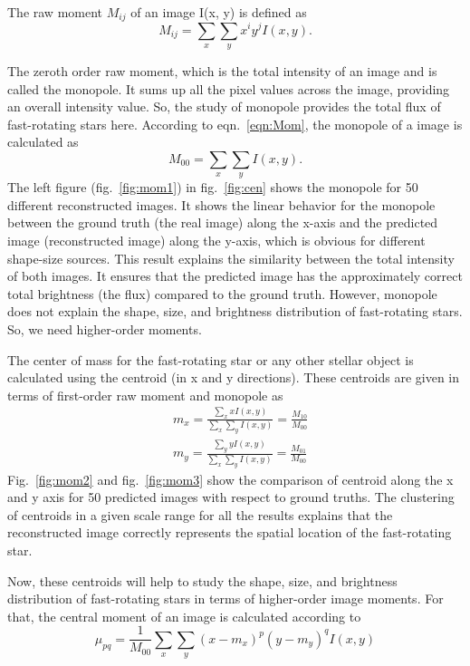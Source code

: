 The raw moment $M_{ij}$ of an image I(x, y) is defined as \citep{hu1962visual}
\begin{equation}
	M_{ij} = \sum_{x} \sum_{y} x^i y^j I(x, y).
	\label{eqn:Mom}
\end{equation}

The zeroth order raw moment, which is the total intensity of an image and is called the monopole. It sums up all the pixel values across the image, providing an overall intensity value. So, the study of monopole provides the total flux of fast-rotating stars here. According to eqn.~\ref{eqn:Mom}, the monopole of a image is calculated as 
\begin{equation}
	M_{00} = \sum_{x} \sum_{y} I(x, y).
\end{equation}
The left figure (fig.~\ref{fig:mom1}) in fig.~\ref{fig:cen} shows the monopole for 50 different reconstructed images. It shows the linear behavior for the monopole between the ground truth (the real image) along the x-axis and the predicted image (reconstructed image) along the y-axis, which is obvious for different shape-size sources. This result explains the similarity between the total intensity of both images. It ensures that the predicted image has the approximately correct total brightness (the flux) compared to the ground truth. However, monopole does not explain the shape, size, and brightness distribution of fast-rotating stars. So, we need higher-order moments.

The center of mass for the fast-rotating star or any other stellar object is calculated using the centroid (in x and y directions). These centroids are given in terms of first-order raw moment and monopole as
\begin{equation}
	\begin{aligned}
		&m_x = \frac{\sum_{x} x I(x,y)}{\sum_{x} \sum_{y} I(x, y)} = \frac{M_{10}}{M_{00}} \\
		&m_y = \frac{\sum_{y} y I(x,y)}{\sum_{x} \sum_{y} I(x, y)} = \frac{M_{01}}{M_{00}}
	\end{aligned}  
\end{equation}
Fig.~\ref{fig:mom2} and fig.~\ref{fig:mom3} show the comparison of centroid along the x and y axis for 50 predicted images with respect to ground truths. The clustering of centroids in a given scale range for all the results explains that the reconstructed image correctly represents the spatial location of the fast-rotating star.

Now, these centroids will help to study the shape, size, and brightness distribution of fast-rotating stars in terms of higher-order image moments. For that, the central moment of an image is calculated according to
\begin{equation}
	\mu_{pq} = \frac{1}{M_{00}}\sum_{x} \sum_{y} (x - m_x)^p (y - m_y)^q I(x, y)
\end{equation}

